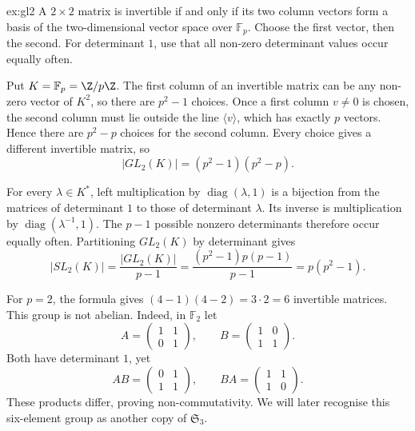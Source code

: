 \begin{solution}{ex:gl2}
\idea A $2\times2$ matrix is invertible if and only if its two column vectors form a basis of the two-dimensional vector space over $\mathbb F_p$. Choose the first vector, then the second. For determinant $1$, use that all non-zero determinant values occur equally often.

\writeup Put $K=\mathbb F_p=\Z/p\Z$. The first column of an invertible matrix can be any non-zero vector of $K^2$, so there are $p^2-1$ choices. Once a first column $v\ne0$ is chosen, the second column must lie outside the line $\langle v\rangle$, which has exactly $p$ vectors. Hence there are $p^2-p$ choices for the second column. Every choice gives a different invertible matrix, so
\[
\boxed{|GL_2(K)|=(p^2-1)(p^2-p)}.
\]

For every $\lambda\in K^*$, left multiplication by $\operatorname{diag}(\lambda,1)$ is a bijection from the matrices of determinant $1$ to those of determinant $\lambda$. Its inverse is multiplication by $\operatorname{diag}(\lambda^{-1},1)$. The $p-1$ possible nonzero determinants therefore occur equally often. Partitioning $GL_2(K)$ by determinant gives
\[
|SL_2(K)|=\frac{|GL_2(K)|}{p-1}
=\frac{(p^2-1)p(p-1)}{p-1}
=\boxed{p(p^2-1)}.
\]

For $p=2$, the formula gives $(4-1)(4-2)=3\cdot2=6$ invertible matrices. This group is not abelian. Indeed, in $\mathbb F_2$ let
\[
A=\begin{pmatrix}1&1\\0&1\end{pmatrix},
\qquad
B=\begin{pmatrix}1&0\\1&1\end{pmatrix}.
\]
Both have determinant $1$, yet
\[
AB=\begin{pmatrix}0&1\\1&1\end{pmatrix},
\qquad
BA=\begin{pmatrix}1&1\\1&0\end{pmatrix}.
\]
These products differ, proving non-commutativity. We will later recognise this six-element group as another copy of $\mathfrak S_3$.
\end{solution}

